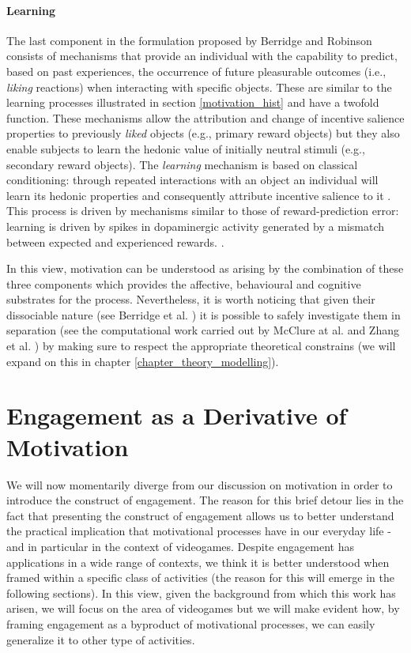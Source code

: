 \paragraph*{Learning}
\label{learning}
The last component in the formulation proposed by Berridge and Robinson \cite{berridge1998role,berridge2004motivation} consists of mechanisms that provide an individual with the capability to predict, based on past experiences, the occurrence of future pleasurable outcomes (i.e., \emph{liking} reactions) when interacting with specific objects. These are similar to the learning processes illustrated in section \ref{motivation_hist} and have a twofold function. These mechanisms allow the attribution and change of incentive salience properties to previously \emph{liked} objects (e.g., primary reward objects) but they also enable subjects to learn the hedonic value of initially neutral stimuli (e.g., secondary reward objects). The \emph{learning} mechanism is based on classical conditioning: through repeated interactions with an object an individual will learn its hedonic properties and consequently attribute incentive salience to it \cite{berridge2004motivation,berridge2009dissecting}. This process is driven by mechanisms similar to those of reward-prediction error: learning is driven by spikes in dopaminergic activity generated by a mismatch between expected and experienced rewards. \cite{schultz1997neural,schultz2000multiple,flagel2011selective}.

In this view, motivation can be understood as arising by the combination of these three components \cite{berridge1998role, berridge2004motivation, berridge2008affective} which provides the affective, behavioural and cognitive substrates for the process. Nevertheless, it is worth noticing that given their dissociable nature (see Berridge et al. \cite{berridge2009dissecting}) it is possible to safely investigate them in separation (see the computational work carried out by McClure at al. \cite{mcclure2003computational} and Zhang et al. \cite{zhang2009neural}) by making sure to respect the appropriate theoretical constrains (we will expand on this in chapter \ref{chapter_theory_modelling}).

\section{Engagement as a Derivative of Motivation}
\label{engagement}
We will now momentarily diverge from our discussion on motivation in order to introduce the construct of engagement. The reason for this brief detour lies in the fact that presenting the construct of engagement allows us to better understand the practical implication that motivational processes have in our everyday life - and in particular in the context of videogames. Despite engagement has applications in a wide range of contexts, we think it is better understood when framed within a specific class of activities (the reason for this will emerge in the following sections). In this view, given the background from which this work has arisen, we will focus on the area of videogames but we will make evident how, by framing engagement as a byproduct of motivational processes, we can easily generalize it to other type of activities.

